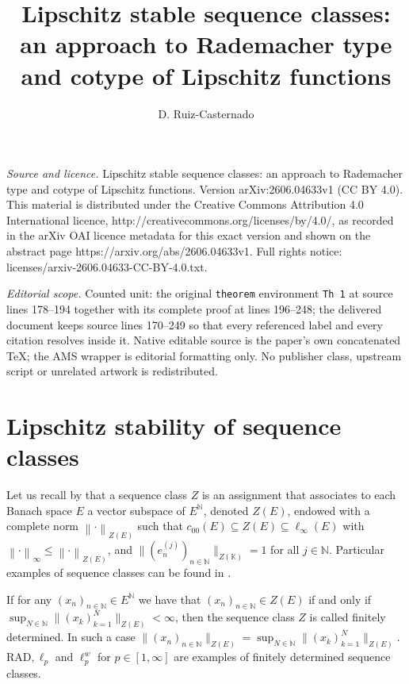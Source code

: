 \documentclass[10pt,a4paper]{amsart}
\def\K{\mathbb{K}}
\def\N{\mathbb{N}}
\def\RAD{\mathrm{RAD}}
\begin{document}
\title[Lipschitz stable sequence classes: an approach to Rademacher]{Lipschitz stable sequence classes: an approach to Rademacher type and cotype of Lipschitz functions}
\author{D. Ruiz-Casternado}
\date{}
\maketitle
\noindent\emph{Source and licence.} Lipschitz stable sequence classes: an approach to Rademacher type and cotype of Lipschitz functions. Version arXiv:2606.04633v1 (CC BY 4.0). This material is distributed under the Creative Commons Attribution 4.0 International licence, http://creativecommons.org/licenses/by/4.0/, as recorded in the arXiv OAI licence metadata for this exact version and shown on the abstract page https://arxiv.org/abs/2606.04633v1. Full rights notice: licenses/arxiv-2606.04633-CC-BY-4.0.txt.\par\smallskip
\noindent\textit{Editorial scope.} Counted unit: the original \texttt{theorem} environment \texttt{Th 1} at source lines 178--194 together with its complete proof at lines 196--248; the delivered document keeps source lines 170--249 so that every referenced label and every citation resolves inside it. Native editable source is the paper's own concatenated TeX; the AMS wrapper is editorial formatting only. No publisher class, upstream script or unrelated artwork is redistributed.
\section{Lipschitz stability of sequence classes}\label{Sec 2}

Let us recall by \cite[Definition 2.1]{BotCam-17} that a sequence class $Z$ is an assignment that associates to each Banach space $E$ a vector subspace of $E^\N$, denoted $Z(E)$, endowed with a complete norm $\left\|\cdot\right\|_{Z(E)}$ such that $c_{00}(E) \subseteq Z(E) \subseteq \ell_\infty(E)$ with $\left\|\cdot\right\|_\infty \leq \left\|\cdot\right\|_{Z(E)}$, and $\|(e_n^{(j)})_{n\in\N}\|_{Z(\K)}=1$ for all $j \in \N$. Particular examples of sequence classes can be found in \cite[Example 2.2]{BotCam-17}.

If for any $(x_n)_{n\in\N} \in E^\N$ we have that $(x_n)_{n\in\N}\in Z(E)$ if and only if $\sup_{N\in\N} \|(x_k)_{k=1}^N\|_{Z(E)}<\infty$, then the sequence class $Z$ is called finitely determined. In such a case $\|(x_n)_{n\in\N}\|_{Z(E)}=\sup_{N\in\N}\|(x_k)_{k=1}^N\|_{Z(E)}$. $\RAD,\ell_p$ and $\ell_p^w$ for $p\in [1,\infty]$ are examples of finitely determined sequence classes.
\end{document}
